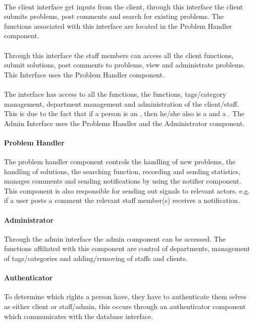 \paragraph{\cinterface}
The client interface get inputs from the client, through this interface the client submits problems, post comments and search for existing problems.
The functions associated with this interface are located in the Problem Handler component.  

\paragraph{\sinterface}
Through this interface the staff members can access all the client functions, submit solutions, post comments to \open[] problems, view \worklist[] and administrate problems.
This Interface uses the Problem Handler component. 

\paragraph{\ainterface}  
The interface has access to all the \aclient[] functions, the \astaff[] functions, tags/category management, department management and administration of the client/staff. This is due to the fact that if a person is an \admin[], then he/she also is a \astaff[] and a \aclient[]. The Admin Interface uses the Problems Handler and the Administrator component. 

\paragraph{Problem Handler}
The problem handler component controls the handling of new problems, the handling of solutions, the searching function, recording and sending statistics, manages comments and sending notifications by using the notifier component.
This component is also responsible for sending out signals to relevant actors. e.g. if a user posts a comment the relevant staff member(s) receives a notification.  

\paragraph{Administrator}
Through the admin interface the admin component can be accessed. The functions affiliated with this component are control of departments, management of tags/categories and adding/removing of staffs and clients.   

\paragraph{Authenticator}
To determine which rights a person have, they have to authenticate them selves as either client or staff/admin, this occurs through an authenticator component which communicates with the database interface. 
